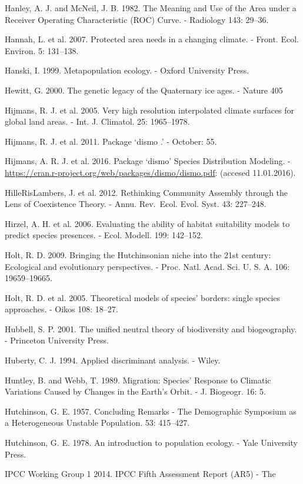 \documentclass[11pt,twoside]{reedthesis}
\begin{document}
Hanley, A. J. and McNeil, J. B. 1982. The Meaning and Use of the Area
under a Receiver Operating Characteristic (ROC) Curve. - Radiology 143:
29--36.\par
Hannah, L. et al. 2007. Protected area needs in a changing climate. -
Front. Ecol. Environ. 5: 131--138.\par
Hanski, I. 1999. Metapopulation ecology. - Oxford University Press.\par
Hewitt, G. 2000. The genetic legacy of the Quaternary ice ages. - Nature
405\par
Hijmans, R. J. et al. 2005. Very high resolution interpolated climate
surfaces for global land areas. - Int. J. Climatol. 25: 1965--1978.\par
Hijmans, R. J. et al. 2011. Package `dismo .' - October: 55.\par
Hijmans, A. R. J. et al. 2016. Package `dismo' Species Distribution
Modeling. -
\url{https://cran.r-project.org/web/packages/dismo/dismo.pdf}: (accesed
11.01.2016).\par
HilleRisLambers, J. et al. 2012. Rethinking Community Assembly through
the Lens of Coexistence Theory. - Annu. Rev.~Ecol. Evol. Syst. 43:
227--248.\par
Hirzel, A. H. et al. 2006. Evaluating the ability of habitat suitability
models to predict species presences. - Ecol. Modell. 199: 142--152.\par
Holt, R. D. 2009. Bringing the Hutchinsonian niche into the 21st
century: Ecological and evolutionary perspectives. - Proc. Natl. Acad.
Sci. U. S. A. 106: 19659--19665.\par
Holt, R. D. et al. 2005. Theoretical models of species' borders: single
species approaches. - Oikos 108: 18--27.\par
Hubbell, S. P. 2001. The unified neutral theory of biodiversity and
biogeography. - Princeton University Press.\par
Huberty, C. J. 1994. Applied discriminant analysis. - Wiley.\par
Huntley, B. and Webb, T. 1989. Migration: Species' Response to Climatic
Variations Caused by Changes in the Earth's Orbit. - J. Biogeogr. 16:
5.\par
Hutchinson, G. E. 1957. Concluding Remarks - The Demographic Symposium
as a Heterogeneous Unstable Population. 53: 415--427.\par
Hutchinson, G. E. 1978. An introduction to population ecology. - Yale
University Press.\par
IPCC Working Group 1 2014. IPCC Fifth Assessment Report (AR5) - The
\end{document}
